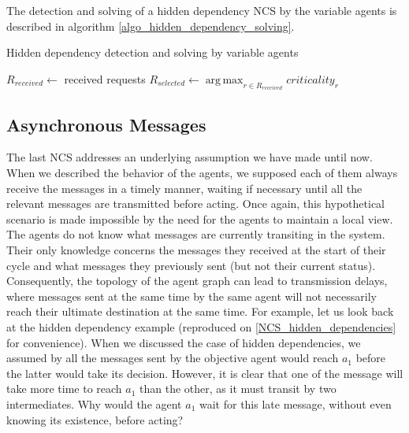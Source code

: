 The detection and solving of a hidden dependency NCS by the variable agents is described in algorithm \ref{algo_hidden_dependency_solving}.

\begin{algorithm}
\caption{Hidden dependency detection and solving by variable agents}
\label{algo_hidden_dependency_solving}

	$R_{received} \leftarrow $ received requests\;
	$R_{selected} \leftarrow \displaystyle\operatorname*{arg\,max}_{r \in R_{received}} criticality_r$\;


\end{algorithm}

\subsection{Asynchronous Messages}\label{NCS_async}

The last NCS addresses an underlying assumption we have made until now. When we described the behavior of the agents, we supposed each of them always receive the messages in a timely manner, waiting if necessary until all the relevant messages are transmitted before acting. Once again, this hypothetical scenario is made impossible by the need for the agents to maintain a local view. The agents do not know what messages are currently transiting in the system. Their only knowledge concerns the messages they received at the start of their cycle and what messages they previously sent (but not their current status). Consequently, the topology of the agent graph can lead to transmission delays, where messages sent at the same time by the same agent will not necessarily reach their ultimate destination at the same time. For example, let us look back at the hidden dependency example (reproduced on \figurename{} \ref{NCS_hidden_dependencies} for convenience). When we discussed the case of hidden dependencies, we assumed by all the messages sent by the objective agent would reach $a_1$ before the latter would take its decision. However, it is clear that one of the message will take more time to reach $a_1$ than the other, as it must transit by two intermediates. Why would the agent $a_1$ wait for this late message, without even knowing its existence, before acting?

